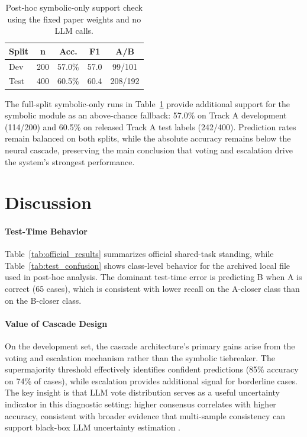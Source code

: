 \documentclass[11pt]{article}
\begin{document}
\begin{table}[t]
\centering
\footnotesize
\begin{tabular}{@{}lcccc@{}}
\toprule
\textbf{Split} & \textbf{n} & \textbf{Acc.} & \textbf{F1} & \textbf{A/B} \\
\midrule
Dev & 200 & 57.0\% & 57.0 & 99/101 \\
Test & 400 & 60.5\% & 60.4 & 208/192 \\
\bottomrule
\end{tabular}
\caption{Post-hoc symbolic-only support check using the fixed paper weights and no LLM calls.}
\label{tab:symbolic_only}
\end{table}

The full-split symbolic-only runs in Table~\ref{tab:symbolic_only} provide additional support for the symbolic module as an above-chance fallback: 57.0\% on Track A development (114/200) and 60.5\% on released Track A test labels (242/400). Prediction rates remain balanced on both splits, while the absolute accuracy remains below the neural cascade, preserving the main conclusion that voting and escalation drive the system's strongest performance.


\section{Discussion}

\paragraph{Test-Time Behavior}
Table~\ref{tab:official_results} summarizes official shared-task standing, while Table~\ref{tab:test_confusion} shows class-level behavior for the archived local file used in post-hoc analysis. The dominant test-time error is predicting B when A is correct (65 cases), which is consistent with lower recall on the A-closer class than on the B-closer class.

\paragraph{Value of Cascade Design}
On the development set, the cascade architecture's primary gains arise from the voting and escalation mechanism rather than the symbolic tiebreaker. The supermajority threshold effectively identifies confident predictions (85\% accuracy on 74\% of cases), while escalation provides additional signal for borderline cases. The key insight is that LLM vote distribution serves as a useful uncertainty indicator in this diagnostic setting: higher consensus correlates with higher accuracy, consistent with broader evidence that multi-sample consistency can support black-box LLM uncertainty estimation \citep{xiong2024uncertainty}.
\end{document}
